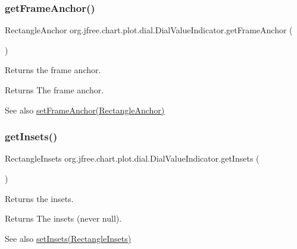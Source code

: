 \subsubsection{\texorpdfstring{get\+Frame\+Anchor()}{getFrameAnchor()}}
{\footnotesize\ttfamily Rectangle\+Anchor org.\+jfree.\+chart.\+plot.\+dial.\+Dial\+Value\+Indicator.\+get\+Frame\+Anchor (\begin{DoxyParamCaption}{ }\end{DoxyParamCaption})}

Returns the frame anchor.

\begin{DoxyReturn}{Returns}
The frame anchor.
\end{DoxyReturn}
\begin{DoxySeeAlso}{See also}
\mbox{\hyperlink{classorg_1_1jfree_1_1chart_1_1plot_1_1dial_1_1_dial_value_indicator_a88eb182999623eac46ffcfcdfea3a207}{set\+Frame\+Anchor(\+Rectangle\+Anchor)}} 
\end{DoxySeeAlso}
\mbox{\label{classorg_1_1jfree_1_1chart_1_1plot_1_1dial_1_1_dial_value_indicator_af0d989e123325396bb3ca0ea8a824ff6}} 
\subsubsection{\texorpdfstring{get\+Insets()}{getInsets()}}
{\footnotesize\ttfamily Rectangle\+Insets org.\+jfree.\+chart.\+plot.\+dial.\+Dial\+Value\+Indicator.\+get\+Insets (\begin{DoxyParamCaption}{ }\end{DoxyParamCaption})}

Returns the insets.

\begin{DoxyReturn}{Returns}
The insets (never {\ttfamily null}).
\end{DoxyReturn}
\begin{DoxySeeAlso}{See also}
\mbox{\hyperlink{classorg_1_1jfree_1_1chart_1_1plot_1_1dial_1_1_dial_value_indicator_a6dd9a20b2bc7cdded649eddf0e76fcd6}{set\+Insets(\+Rectangle\+Insets)}} 
\end{DoxySeeAlso}
\mbox{\label{classorg_1_1jfree_1_1chart_1_1plot_1_1dial_1_1_dial_value_indicator_a101533e3bd8a775d29348f204da5e76d}} 
